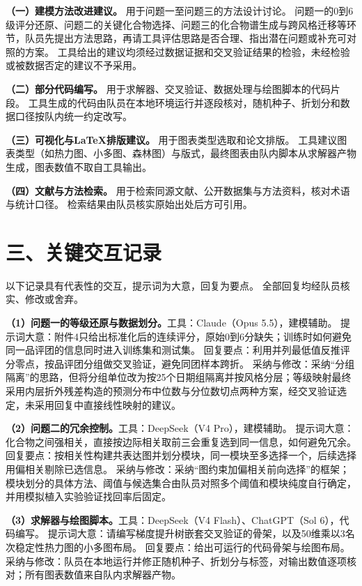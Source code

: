 \documentclass[11pt,a4paper]{article}
\begin{document}
\textbf{（一）建模方法改进建议。}
用于问题一至问题三的方法设计讨论。
问题一的0到6级评分还原、问题二的关键化合物选择、问题三的化合物谱生成与跨风格迁移等环节，队员先提出方法思路，再请工具评估思路是否合理、指出潜在问题或补充可对照的方案。
工具给出的建议均须经过数据证据和交叉验证结果的检验，未经检验或被数据否定的建议不予采用。

\textbf{（二）部分代码编写。}
用于求解器、交叉验证、数据处理与绘图脚本的代码片段。
工具生成的代码由队员在本地环境运行并逐段核对，随机种子、折划分和数据口径按队内统一约定改写。

\textbf{（三）可视化与LaTeX排版建议。}
用于图表类型选取和论文排版。
工具建议图表类型（如热力图、小多图、森林图）与版式，最终图表由队内脚本从求解器产物生成，图表数值不取自工具输出。

\textbf{（四）文献与方法检索。}
用于检索同源文献、公开数据集与方法资料，核对术语与统计口径。
检索结果由队员核实原始出处后方可引用。

\section*{三、关键交互记录}

以下记录具有代表性的交互，提示词为大意，回复为要点。
全部回复均经队员核实、修改或舍弃。

\textbf{（1）问题一的等级还原与数据划分。}工具：Claude（Opus 5.5），建模辅助。
提示词大意：附件4只给出标准化后的连续评分，原始0到6分缺失；训练时如何避免同一品评团的信息同时进入训练集和测试集。
回复要点：利用并列最低值反推评分零点，按品评团分组做交叉验证，避免同团样本跨折。
采纳与修改：采纳“分组隔离”的思路，但将分组单位改为按25个日期组隔离并按风格分层；等级映射最终采用内层折外残差构造的预测分布中位数与分位数切点两种方案，经交叉验证选定，未采用回复中直接线性映射的建议。

\textbf{（2）问题二的冗余控制。}工具：DeepSeek（V4 Pro），建模辅助。
提示词大意：化合物之间强相关，直接按边际相关取前三会重复选到同一信息，如何避免冗余。
回复要点：按相关性构建共表达图并划分模块，同一模块至多选择一个，后续选择用偏相关剔除已选信息。
采纳与修改：采纳“图约束加偏相关前向选择”的框架；模块划分的具体方法、阈值与候选集合由队员对照多个阈值和模块纯度自行确定，并用模拟植入实验验证找回率后固定。

\textbf{（3）求解器与绘图脚本。}工具：DeepSeek（V4 Flash）、ChatGPT（Sol 6），代码编写。
提示词大意：请编写梯度提升树嵌套交叉验证的骨架，以及50维乘以3名次稳定性热力图的小多图布局。
回复要点：给出可运行的代码骨架与绘图布局。
采纳与修改：队员在本地运行并修正随机种子、折划分与标签，对输出数值逐项核对；所有图表数值来自队内求解器产物。
\end{document}
